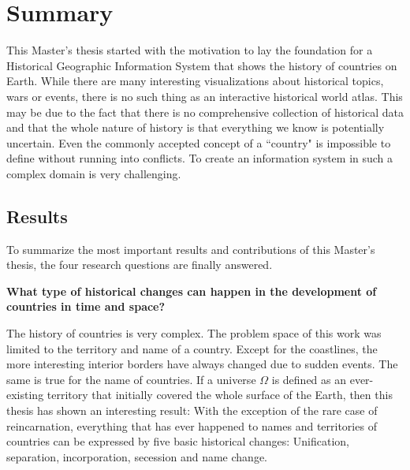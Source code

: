 
\chapter{Summary} %
\label{cha:summary}


This Master's thesis started with the motivation to lay the foundation for a Historical Geographic Information System that shows the history of countries on Earth. While there are many interesting visualizations about historical topics, wars or events, there is no such thing as an interactive historical world atlas. This may be due to the fact that there is no comprehensive collection of historical data and that the whole nature of history is that everything we know is potentially uncertain. Even the commonly accepted concept of a ``country" is impossible to define without running into conflicts. To create an information system in such a complex domain is very challenging.


\section{Results} %
\label{sec:results}

To summarize the most important results and contributions of this Master's thesis, the four research questions are finally answered.

\begin{description}[labelindent=0.55em]
  \item[\textbf{1)}]
  \textbf{
    What type of historical changes can happen in the development of countries in time and space?
  }
\end{description}

The history of countries is very complex. The problem space of this work was limited to the territory and name of a country. Except for the coastlines, the more interesting interior borders have always changed due to sudden events. The same is true for the name of countries. If a universe $\Omega$ is defined as an ever-existing territory that initially covered the whole surface of the Earth, then this thesis has shown an interesting result: With the exception of the rare case of reincarnation, everything that has ever happened to names and territories of countries can be expressed by five basic historical changes: Unification, separation, incorporation, secession and name change.


